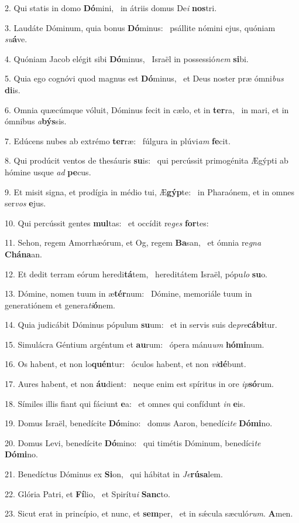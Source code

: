 2. Qui statis in domo \textbf{Dó}mini, \ast\  in átriis domus De\textit{i} \textbf{nos}tri.\

3. Laudáte Dóminum, quia bonus \textbf{Dó}minus: \ast\  psállite nómini ejus, quóniam \textit{su}\textbf{á}ve.\

4. Quóniam Jacob elégit sibi \textbf{Dó}minus, \ast\  Israël in possessió\textit{nem} \textbf{si}bi.\

5. Quia ego cognóvi quod magnus est \textbf{Dó}minus, \ast\  et Deus noster præ ómni\textit{bus} \textbf{di}is.\

6. Omnia quæcúmque vóluit, Dóminus fecit in cælo, et in \textbf{ter}ra, \ast\  in mari, et in ómnibus \textit{a}\textbf{býs}sis.\

7. Edúcens nubes ab extrémo \textbf{ter}ræ: \ast\  fúlgura in plúvi\textit{am} \textbf{fe}cit.\

8. Qui prodúcit ventos de thesáuris \textbf{su}is: \ast\  qui percússit primogénita Ægýpti ab hómine usque \textit{ad} \textbf{pe}cus.\

9. Et misit signa, et prodígia in médio tui, Æ\textbf{gýp}te: \ast\  in Pharaónem, et in omnes ser\textit{vos} \textbf{e}jus.\

10. Qui percússit gentes \textbf{mul}tas: \ast\  et occídit re\textit{ges} \textbf{for}tes:\

11. Sehon, regem Amorrhæórum, et Og, regem \textbf{Ba}san, \ast\  et ómnia re\textit{gna} \textbf{Chá}\textbf{na}an.\

12. Et dedit terram eórum heredi\textbf{tá}tem, \ast\  hereditátem Israël, pópu\textit{lo} \textbf{su}o.\

13. Dómine, nomen tuum in æ\textbf{tér}num: \ast\  Dómine, memoriále tuum in generatiónem et genera\textit{ti}\textbf{ó}nem.\

14. Quia judicábit Dóminus pópulum \textbf{su}um: \ast\  et in servis suis de\textit{pre}\textbf{cá}\textbf{bi}tur.\

15. Simulácra Géntium argéntum et \textbf{au}rum: \ast\  ópera mánu\textit{um} \textbf{hó}\textbf{mi}num.\

16. Os habent, et non lo\textbf{quén}tur: \ast\  óculos habent, et non \textit{vi}\textbf{dé}bunt.\

17. Aures habent, et non \textbf{áu}dient: \ast\  neque enim est spíritus in ore \textit{ip}\textbf{só}rum.\

18. Símiles illis fiant qui fáciunt \textbf{e}a: \ast\  et omnes qui confídunt \textit{in} \textbf{e}is.\

19. Domus Israël, benedícite \textbf{Dó}mino: \ast\  domus Aaron, benedíci\textit{te} \textbf{Dó}\textbf{mi}no.\

20. Domus Levi, benedícite \textbf{Dó}mino: \ast\  qui timétis Dóminum, benedíci\textit{te} \textbf{Dó}\textbf{mi}no.\

21. Benedíctus Dóminus ex \textbf{Si}on, \ast\  qui hábitat in \textit{Je}\textbf{rú}\textbf{sa}lem.\

22. Glória Patri, et \textbf{Fí}lio, \ast\  et Spirítu\textit{i} \textbf{Sanc}to.\

23. Sicut erat in princípio, et nunc, et \textbf{sem}per, \ast\  et in sǽcula sæculó\textit{rum}. \textbf{A}men.\

